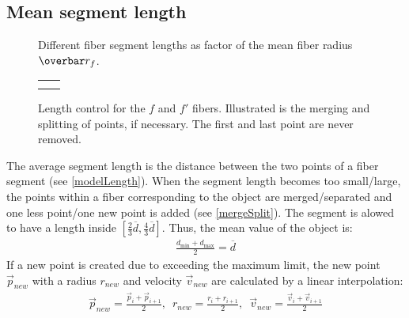 \subsection{Mean segment length}
%
\begin{figure}[!t]
    \centering
    \setlength{\tikzwidth}{0.75\textwidth}
	\caption{Different fiber segment lengths as factor of the mean fiber radius $\fiberRadiusMean$.}
	\label{fig:modelLength}
\end{figure}
%
\begin{figure}[!t]
    \centering
    \tikzset{external/export=false}
    \def\forcetikzscale{true}
    \setlength{\tabcolsep}{0pt}
    \setlength{\tikzwidth}{.45\textwidth}
    \begin{tabular}{C{.5\textwidth}C{.5\textwidth}}
     &
     \\
     &
    \end{tabular}
	\caption{Length control for the $f$ and $f'$ fibers. Illustrated is the merging and splitting of points, if necessary. The first and last point are never removed.}
	\label{fig:mergeSplit}
\end{figure}
%
The average segment length is the distance between the two points of a fiber segment (see \cref{modelLength}).
When the segment length becomes too small/large, the points within a fiber corresponding to the object are merged/separated and one less point/one new point is added (see \cref{mergeSplit}).
The segment is alowed to have a length inside $[\frac{2}{3} \overline{d},\frac{4}{3} \overline{d}]$. 
Thus, the mean value of the object is:
\begin{align}
\frac{d_{\min} + d_{\max}}{2} = \overline{d}
\end{align}
%
If a new point is created due to exceeding the maximum limit, the new point $\vec{p}_{new}$ with a radius $r_{new}$ and velocity $\vec{v}_{new}$ are calculated by a linear interpolation:
\begin{align}
\vec{p}_{new} = \frac{\vec{p}_{i} + \vec{p}_{i+1}}{2},\enspace
r_{new} = \frac{r_{i} + r_{i+1}}{2},\enspace
\vec{v}_{new} = \frac{\vec{v}_{i} + \vec{v}_{i+1}}{2}
\end{align}
%
% 
% 
